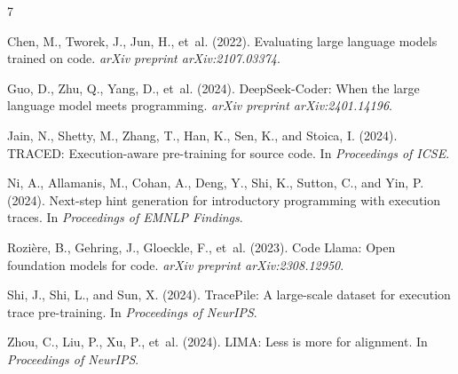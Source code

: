 \documentclass[11pt,a4paper]{article}
\begin{document}
\begin{thebibliography}{7}
\providecommand{\natexlab}[1]{#1}

Chen, M., Tworek, J., Jun, H., et~al. (2022).
Evaluating large language models trained on code.
\textit{arXiv preprint arXiv:2107.03374}.

Guo, D., Zhu, Q., Yang, D., et~al. (2024).
DeepSeek-Coder: When the large language model meets programming.
\textit{arXiv preprint arXiv:2401.14196}.

Jain, N., Shetty, M., Zhang, T., Han, K., Sen, K., and Stoica, I. (2024).
TRACED: Execution-aware pre-training for source code.
In \textit{Proceedings of ICSE}.

Ni, A., Allamanis, M., Cohan, A., Deng, Y., Shi, K., Sutton, C., and Yin, P. (2024).
Next-step hint generation for introductory programming with execution traces.
In \textit{Proceedings of EMNLP Findings}.

Rozi{\`e}re, B., Gehring, J., Gloeckle, F., et~al. (2023).
Code Llama: Open foundation models for code.
\textit{arXiv preprint arXiv:2308.12950}.

Shi, J., Shi, L., and Sun, X. (2024).
TracePile: A large-scale dataset for execution trace pre-training.
In \textit{Proceedings of NeurIPS}.

Zhou, C., Liu, P., Xu, P., et~al. (2024).
LIMA: Less is more for alignment.
In \textit{Proceedings of NeurIPS}.

\end{thebibliography}
\end{document}
